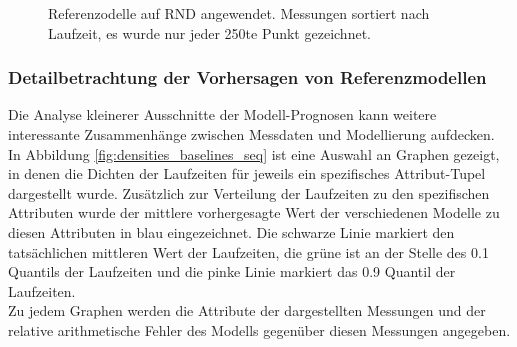 \documentclass[
	12pt,
	a4paper,
	BCOR10mm,
	DIV14,
	listof=totoc,
	bibliography=totoc,
	headsepline
]{scrreprt}
\begin{document}
\begin{figure}
	\centering
	\hfill
	\caption{Referenzodelle auf RND angewendet. Messungen sortiert nach Laufzeit, es wurde nur jeder 250te Punkt gezeichnet.}
	\label{fig:zeit_baselines_sorted_rnd}
\end{figure} 
\clearpage
\subsubsection{Detailbetrachtung der Vorhersagen von Referenzmodellen}
Die Analyse kleinerer Ausschnitte der Modell-Prognosen kann weitere interessante Zusammenhänge zwischen Messdaten und Modellierung aufdecken.\\
In Abbildung \ref{fig:densities_baselines_seq} ist eine Auswahl an Graphen gezeigt, in denen die Dichten der Laufzeiten für jeweils ein spezifisches Attribut-Tupel dargestellt wurde.
Zusätzlich zur Verteilung der Laufzeiten zu den spezifischen Attributen wurde der mittlere vorhergesagte Wert der verschiedenen Modelle zu diesen Attributen in blau eingezeichnet.
Die schwarze Linie markiert den tatsächlichen mittleren Wert der Laufzeiten, die grüne ist an der Stelle des 0.1 Quantils der Laufzeiten und die pinke Linie markiert das 0.9 Quantil der Laufzeiten.\\
Zu jedem Graphen werden die Attribute der dargestellten Messungen und der relative arithmetische Fehler des Modells gegenüber diesen Messungen angegeben.\medskip
\end{document}
